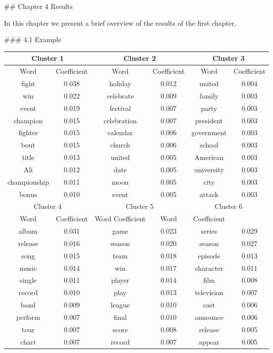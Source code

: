 

## Chapter 4 Results

In this chapter we present a brief overview of the results of the first chapter.

### 4.1 Example

\begin{table}
\begin{tabular}{c c c c c c} \hline \hline \multicolumn{2}{c}{Cluster 1} & \multicolumn{2}{c}{Cluster 2} & \multicolumn{2}{c}{Cluster 3} \\ \hline Word & Coefficient & Word & Coefficient & Word & Coefficient \\ \hline fight & 0.038 & holiday & 0.012 & united & 0.004 \\ win & 0.022 & celebrate & 0.009 & family & 0.003 \\ event & 0.019 & festival & 0.007 & party & 0.003 \\ champion & 0.015 & celebration & 0.007 & president & 0.003 \\ fighter & 0.015 & calendar & 0.006 & government & 0.003 \\ bout & 0.015 & church & 0.006 & school & 0.003 \\ title & 0.013 & united & 0.005 & American & 0.003 \\ Ali & 0.012 & date & 0.005 & university & 0.003 \\ championship & 0.011 & moon & 0.005 & city & 0.003 \\ bonus & 0.010 & event & 0.005 & attack & 0.003 \\ \hline \hline \multicolumn{2}{c}{Cluster 4} & \multicolumn{2}{c}{Cluster 5} & \multicolumn{2}{c}{Cluster 6} \\ \hline Word & Coefficient & Word Coefficient & Word & Coefficient \\ \hline album & 0.031 & game & 0.023 & series & 0.029 \\ release & 0.016 & season & 0.020 & season & 0.027 \\ song & 0.015 & team & 0.018 & episode & 0.013 \\ music & 0.014 & win & 0.017 & character & 0.011 \\ single & 0.011 & player & 0.014 & film & 0.008 \\ record & 0.010 & play & 0.013 & television & 0.007 \\ band & 0.009 & league & 0.010 & cast & 0.006 \\ perform & 0.007 & final & 0.010 & announce & 0.006 \\ tour & 0.007 & score & 0.008 & release & 0.005 \\ chart & 0.007 & record & 0.007 & appear & 0.005 \\ \hline \hline \end{tabular} 

\end{table}
